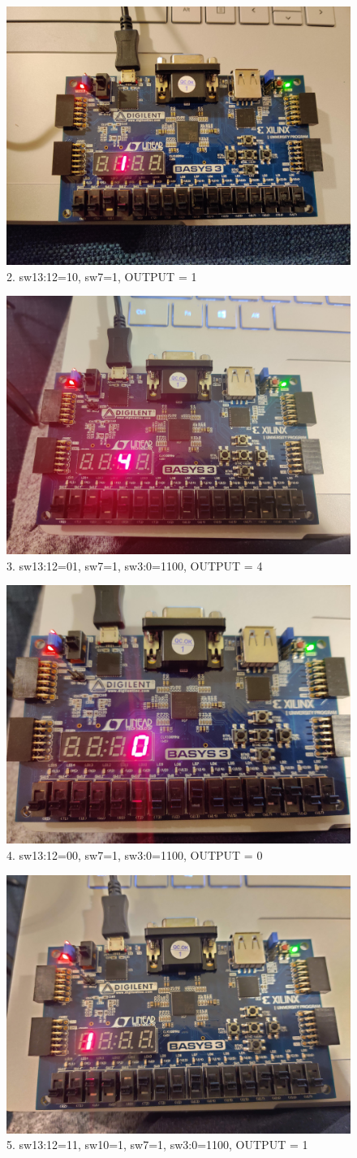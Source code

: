 \documentclass[11pt]{article}
\begin{document}
\begin{figure}[ht]\centering
	\includegraphics[width=.5\textwidth]{board2}
	\caption{2. sw13:12=10, sw7=1, OUTPUT = 1}
	\label{fig:b3_2}			
\end{figure}

\begin{figure}[ht]\centering
	\includegraphics[width=.5\textwidth]{board3}
	\caption{3. sw13:12=01, sw7=1,  sw3:0=1100, OUTPUT = 4}
	\label{fig:b3_3}			
\end{figure}

\begin{figure}[ht]\centering
	\includegraphics[width=.5\textwidth]{board4}
	\caption{4. sw13:12=00, sw7=1, sw3:0=1100, OUTPUT = 0}
	\label{fig:b3_4}			
\end{figure}

\begin{figure}[ht]\centering
	\includegraphics[width=.5\textwidth]{board5}
	\caption{5. sw13:12=11, sw10=1, sw7=1, sw3:0=1100, OUTPUT = 1}
	\label{fig:b3_5}			
\end{figure}
\end{document}
